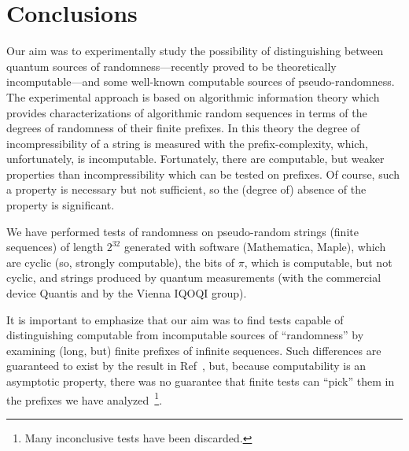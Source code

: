 \documentclass[%
 preprint,
 showpacs,
 showkeys,
 preprintnumbers,
 amsmath,amssymb,
 aps,
 prl,
  longbibliography,
 ]{revtex4-1}
\begin{document}
\section{Conclusions}

\label{conclusion}

Our aim was to experimentally study the possibility of distinguishing between
quantum sources of randomness---recently proved to be theoretically incomputable---and  some well-known computable
sources of  pseudo-randomness. The experimental approach is based on algorithmic information theory
which provides characterizations of algorithmic random sequences in terms of the degrees of
randomness of their finite prefixes.
In this theory the degree of incompressibility of a string is measured with the prefix-complexity, which, unfortunately, is incomputable.
Fortunately, there are computable, but weaker properties than
incompressibility which can be tested on prefixes.
Of course, such a property is necessary but not sufficient, so the (degree of) absence of the property is significant.

We have performed
tests of randomness on pseudo-random strings (finite sequences) of length $2^{32}$ generated with software
(Mathematica, Maple), which are  cyclic (so, strongly computable), the bits of $\pi$, which is computable, but not cyclic, and strings produced by quantum measurements  (with the commercial device Quantis and  by the Vienna IQOQI group).

It is important to emphasize that our aim was to find tests capable of  distinguishing computable
from incomputable sources of ``randomness'' by examining (long, but) finite prefixes of infinite sequences.
Such differences are guaranteed to exist by the result in Ref~\cite{2008-cal-svo}, but,
because computability is an asymptotic property,
there was no guarantee that finite tests can ``pick'' them in the prefixes we have analyzed~\footnote{Many inconclusive tests have been discarded.}.
\end{document}
